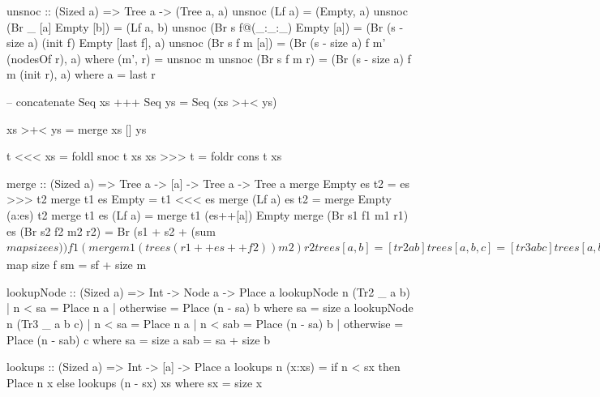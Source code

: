 \documentclass[b5paper]{article}
\begin{document}
\begin{Haskell}
unsnoc :: (Sized a) => Tree a -> (Tree a, a)
unsnoc (Lf a) = (Empty, a)
unsnoc (Br _ [a] Empty [b]) = (Lf a, b)
unsnoc (Br s f@(_:_:_) Empty [a]) = (Br (s - size a) (init f) Empty [last f], a)
unsnoc (Br s f m [a]) = (Br (s - size a) f m' (nodesOf r), a)
    where (m', r) = unsnoc m
unsnoc (Br s f m r) = (Br (s - size a) f m (init r), a) where a = last r

-- concatenate
Seq xs +++ Seq ys = Seq (xs >+< ys)

xs >+< ys = merge xs [] ys

t <<< xs = foldl snoc t xs
xs >>> t = foldr cons t xs

merge :: (Sized a) => Tree a -> [a] -> Tree a -> Tree a
merge Empty es t2 = es >>> t2
merge t1 es Empty = t1 <<< es
merge (Lf a) es t2 = merge Empty (a:es) t2
merge t1 es (Lf a) = merge t1 (es++[a]) Empty
merge (Br s1 f1 m1 r1) es (Br s2 f2 m2 r2) =
    Br (s1 + s2 + (sum $ map size es)) f1 (merge m1 (trees (r1 ++ es ++ f2)) m2) r2

trees [a, b] = [tr2 a b]
trees [a, b, c] = [tr3 a b c]
trees [a, b, c, d] = [tr2 a b, tr2 c d]
trees (a:b:c:es) = (tr3 a b c):trees es

-- index
data Place a = Place Int a

getAt :: Seq a -> Int -> Maybe a
getAt (Seq xs) i | i < size xs = case lookupTree i xs of
                     Place _ (Elem x) -> Just x
                 | otherwise = Nothing

lookupTree :: (Sized a) => Int -> Tree a -> Place a
lookupTree n (Lf a) = Place n a
lookupTree n (Br s f m r) | n < sf = lookups n f
                          | n < sm = case lookupTree (n - sf) m of
                                            Place n' xs -> lookupNode n' xs
                          | n < s = lookups (n - sm) r
  where sf = sum $ map size f
        sm = sf + size m

lookupNode :: (Sized a) => Int -> Node a -> Place a
lookupNode n (Tr2 _ a b) | n < sa = Place n a
                         | otherwise = Place (n - sa) b
  where sa = size a
lookupNode n (Tr3 _ a b c) | n < sa = Place n a
                           | n < sab = Place (n - sa) b
                           | otherwise = Place (n - sab) c
  where sa = size a
        sab = sa + size b

lookups :: (Sized a) => Int -> [a] -> Place a
lookups n (x:xs) = if n < sx then Place n x
                   else lookups (n - sx) xs
  where sx = size x
\end{Haskell}

\ifx\wholebook\relax \else
\end{document}

